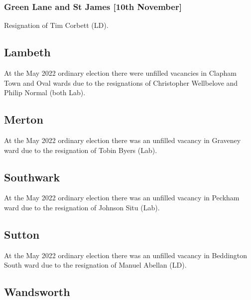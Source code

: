\documentclass[a4paper,openany]{book}
\begin{document}
\begin{resultsiii}
\subsubsection*{Green Lane and St James \hspace*{\fill}\nolinebreak[1]%
	\enspace\hspace*{\fill}
	[10th November]}


Resignation of Tim Corbett (LD).

\subsection*{Lambeth}

At the May 2022 ordinary election there were unfilled vacancies in Clapham Town and Oval wards due to the resignations of Christopher Wellbelove and Philip Normal (both Lab).%

\subsection*{Merton}

At the May 2022 ordinary election there was an unfilled vacancy in Graveney ward due to the resignation of Tobin Byers (Lab).%

\subsection*{Southwark}

At the May 2022 ordinary election there was an unfilled vacancy in Peckham ward due to the resignation of Johnson Situ (Lab).%

\subsection*{Sutton}

At the May 2022 ordinary election there was an unfilled vacancy in Beddington South ward due to the resignation of Manuel Abellan (LD).%

\subsection*{Wandsworth}


\end{resultsiii}
\end{document}
